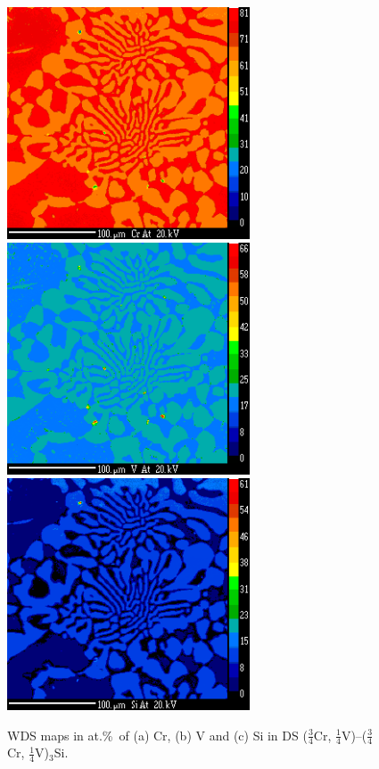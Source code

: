 %
\begin{landscape}
\begin{figure}
\begin{center}
\includegraphics[width=7.2cm]{middle_Cr}
\includegraphics[width=7.2cm]{middle_V}
\includegraphics[width=7.2cm]{middle_Si}
\caption{WDS maps in at.\%\ of (a) Cr, (b) V and (c) Si in DS ($\frac{3}{4}$Cr, $\frac{1}{4}$V)--($\frac{3}{4}$Cr, $\frac{1}{4}$V)$_3$Si.}
\label{fig:tereutmap}
\end{center}
\end{figure}
\end{landscape}
%

